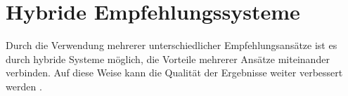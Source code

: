 \section{Hybride Empfehlungssysteme}
\label{ch:empfehlungssysteme:hybrideEmpfehlungssysteme}
Durch die Verwendung mehrerer unterschiedlicher Empfehlungsansätze ist es durch hybride Systeme möglich, die Vorteile mehrerer Ansätze miteinander verbinden. Auf diese Weise kann die Qualität der Ergebnisse weiter verbessert werden \cite[S. 199f.]{recommenderSystems:2016}\cite[S. 8]{malinowski:2008}.

